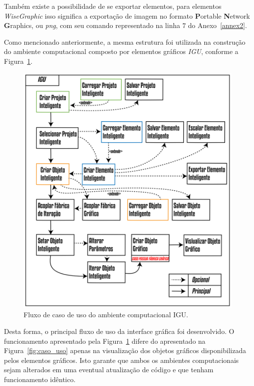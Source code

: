 Também existe a possibilidade de se exportar elementos, para elementos \textit{WiseGraphic} isso significa a exportação de imagem no formato \textbf{P}ortable \textbf{N}etwork \textbf{G}raphics, ou \textit{png}, com seu comando representado na linha $7$ do Anexo~\ref{annex2}.

Como mencionado anteriormente, a mesma estrutura foi utilizada na construção do ambiente computacional composto por elementos gráficos \textit{IGU}, conforme a Figura~\ref{fig:caso_uso2}.

\begin{figure}[!htbp]
	\centering
	\includegraphics[width=\linewidth]{Figures/CasoDeUso2@16x.png}
	\caption{Fluxo de caso de uso do ambiente computacional IGU.}
	\label{fig:caso_uso2}
\end{figure}

 Desta forma, o principal fluxo de uso da interface gráfica foi desenvolvido. O funcionamento apresentado pela Figura~\ref{fig:caso_uso2} difere do apresentado na Figura~\ref{fig:caso_uso} apenas na visualização dos objetos gráficos disponibilizada pelos elementos gráficos. Isto garante que ambos os ambientes computacionais sejam alterados em uma eventual atualização de código e que tenham funcionamento idêntico.

